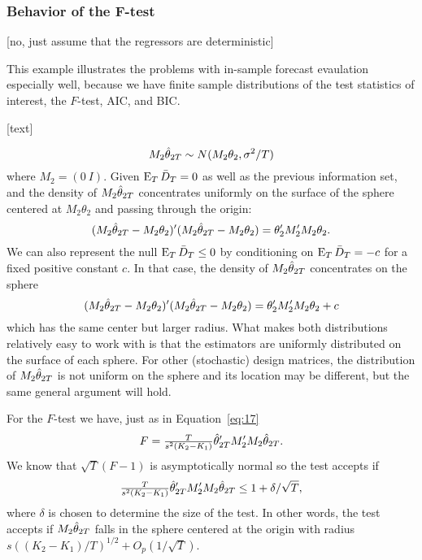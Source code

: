 \documentclass[12pt]{article}
\begin{document}
\subsubsection*{Behavior of the F-test}

[no, just assume that the regressors are deterministic]

This example illustrates the problems with in-sample forecast
evaulation especially well, because we have finite sample
distributions of the test statistics of interest, the $F$-test, AIC,
and BIC.

[text]

\begin{equation*}
  M_2 \hat\theta_{2T} \sim
  N(M_2 \theta_2, \sigma^2/T)
\end{equation*}
where $M_2 = (0\ I)$. Given $\operatorname{E}_T \bar{D}_{T} = 0$ as well as the previous
information set, and the density of $M_2 \hat\theta_{2T}$ concentrates
uniformly on the surface of the sphere centered at $M_2 \theta_2$ and
passing through the origin:
\begin{equation*}
  (M_2 \hat\theta_{2T} - M_2 \theta_2)'(M_2 \hat\theta_{2T} - M_2 \theta_2) =
  \theta_2'M_2' M_2 \theta_2.
\end{equation*}
We can also represent the null $\operatorname{E}_T \bar{D}_{T} \leq 0$ by conditioning on
$\operatorname{E}_T \bar{D}_{T} = -c$ for a fixed positive constant $c$. In that case, the
density of $M_2 \hat\theta_{2T}$ concentrates on the sphere
\begin{equation*}
  (M_2 \hat\theta_{2T} - M_2 \theta_2)'(M_2 \hat\theta_{2T} - M_2 \theta_2) =
  \theta_2'M_2' M_2 \theta_2 + c
\end{equation*}
which has the same center but larger radius. What makes both
distributions relatively easy to work with is that the estimators are
uniformly distributed on the surface of each sphere.
For other (stochastic) design matrices, the distribution of $M_2
\hat\theta_{2T}$ is not uniform on the sphere and its location may be
different, but the same general argument will hold.

For the $F$-test we have, just as in Equation~\eqref{eq:17}
\begin{equation}
  F = \tfrac{T}{s^2 (K_2 - K_1)} \hat\theta_{2T}' M_2' M_2 \hat\theta_{2T}.
\end{equation}
We know that $\sqrt{T}(F - 1)$ is asymptotically normal
\citep{Cal:11c} so the test accepts if
\begin{equation}\label{eq:26}
  \tfrac{T}{s^2 (K_2 - K_1)} \hat\theta_{2T}' M_2' M_2 \hat\theta_{2T}
  \leq 1 + \delta / \sqrt{T},
\end{equation}
where $\delta$ is chosen to determine the size of the test. In other
words, the test accepts if $M_2 \hat\theta_{2T}$ falls in the sphere centered
at the origin with radius $s ((K_2 - K_1) / T)^{1/2} +
O_p(1/\sqrt{T})$.
\end{document}
